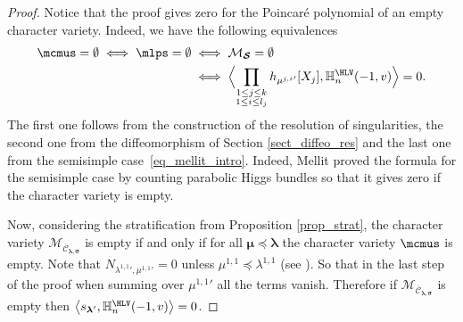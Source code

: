 \begin{proof}
Notice that the proof gives zero for the Poincaré polynomial of an empty character variety. Indeed, we have the following equivalences
\begin{align*}
\mcmus = \emptyset \iff \mlps = \emptyset &\iff \mathcal{M}_{\boldsymbol{\mathcal{S}}} = \emptyset \\
&\iff \Bigl\langle \prod_{\substack{1 \le j \le k \\ 1 \le i \le l_j}} h_{ {\mu^{j,i}}'}[X_j],\mathbb{H}_n^{\HLV}(-1,v)\Bigr\rangle = 0.
\end{align*}
The first one follows from the construction of the resolution of singularities, the second one from the diffeomorphism of Section \ref{sect_diffeo_res} and the last one from the semisimple case~\eqref{eq_mellit_intro}. Indeed, Mellit proved the formula for the semisimple case by counting parabolic Higgs bundles so that it gives zero if the character variety is empty.

Now, considering the stratification from Proposition \ref{prop_strat}, the character variety $\mathcal{M}_{\overline{\mathcal{C}}_{\boldsymbol{\lambda},\boldsymbol{\sigma}}}$ is empty if and only if for all $\boldsymbol{\mu} \preceq \boldsymbol{\lambda}$ the character variety $\mcmus$ is empty. Note that $N_{{\lambda^{1,1}}',{\mu^{1,1}}'} = 0$ unless $\mu^{1,1} \preceq \lambda^{1,1} $ (see \cite[I-6]{Macdonald}). So that in the last step of the proof when summing over ${\mu^{1,1}}'$ all the terms vanish. Therefore if $\mathcal{M}_{\overline{\mathcal{C}}_{\boldsymbol{\lambda},\boldsymbol{\sigma}}}$ is empty then $\left\langle s_{\boldsymbol{\lambda}'}, \mathbb{H}_n^{\HLV}(-1,v)\right\rangle = 0$.
\end{proof}

